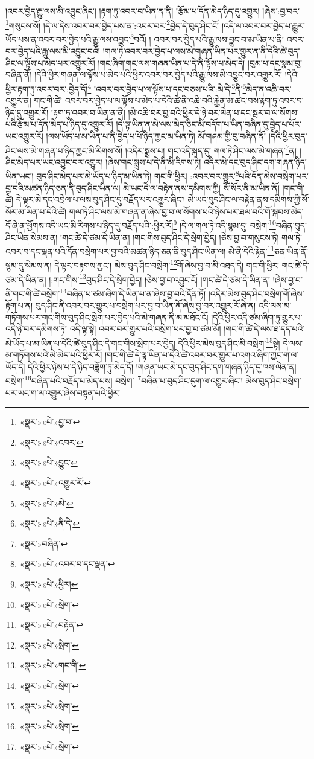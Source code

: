 །འབར་བྱེད་རྒྱུ་ལས་མི་འབྱུང་ཞིང་། །རྟག་ཏུ་འབར་བ་ཡིན་ན་ནི། །རྩོམ་པ་དོན་མེད་ཉིད་དུ་འགྱུར། །ཞེས་:བྱ་བར་\footnote{«སྣར་»«པེ་»བྱ་བ་}གསུངས་སོ། །དེ་ལ་དེས་འབར་བར་བྱེད་པས་ན་:འབར་བར་\footnote{«སྣར་»«པེ་»འབར་}བྱེད་དེ་བུད་ཤིང་ངོ། །འདི་ལ་འབར་བར་བྱེད་པ་རྒྱུར་ཡོད་པས་ན་འབར་བར་བྱེད་པའི་རྒྱུ་ལས་འབྱུང་\footnote{«སྣར་»«པེ་»བྱུང་}བའོ། །
འབར་བར་བྱེད་པའི་རྒྱུ་ལས་བྱུང་བ་མ་ཡིན་པ་ནི། འབར་བར་བྱེད་པའི་རྒྱུ་ལས་མི་འབྱུང་བའོ། །གལ་ཏེ་འབར་བར་བྱེད་པ་ལས་མེ་གཞན་ཡིན་པར་གྱུར་ན་ནི་དེའི་ཚེ་བུད་ཤིང་ལ་ལྟོས་པ་མེད་པར་འགྱུར་རོ། །གང་ཞིག་གང་ལས་གཞན་ཡིན་པ་དེ་ནི་ལྟོས་པ་མེད་དེ། །བུམ་པ་དང་སྣམ་བུ་བཞིན་ནོ། །དེའི་ཕྱིར་གཞན་ལ་ལྟོས་པ་མེད་པའི་ཕྱིར་འབར་བར་བྱེད་པའི་རྒྱུ་ལས་མི་འབྱུང་བར་འགྱུར་རོ། །དེའི་ཕྱིར་རྟག་ཏུ་འབར་བར་:བྱེད་དོ།\footnote{«སྣར་»«པེ་»འགྱུར་རོ།} །འབར་བར་བྱེད་པ་ལ་ལྟོས་པ་དང་བཅས་པའི་:མེ་དེ་\footnote{«སྣར་»«པེ་»མེ་}ནི་\footnote{«སྣར་»«པེ་»ནི་དེ་}མེད་ན་འཆི་བར་འགྱུར་ན། གང་གི་ཚེ། འབར་བར་བྱེད་པ་ལ་ལྟོས་པ་མེད་པ་དེའི་ཚེ་ནི་འཆི་བའི་རྐྱེན་མ་ཚང་བས་རྟག་ཏུ་འབར་བ་ཉིད་དུ་འགྱུར་རོ། །རྟག་ཏུ་འབར་བ་ཡིན་ན་ནི། །མི་འཆི་བར་བྱ་བའི་ཕྱིར་དེ་ཉེ་བར་ལེན་པ་དང་སྦར་བ་ལ་སོགས་པའི་རྩོམ་པ་དོན་མེད་པ་ཉིད་དུ་འགྱུར་རོ། །དེ་ལྟ་ཡིན་ན་མེ་ལས་མེད་ཅིང་མི་བདོག་པ་ཡིན་བཞིན་དུ་བྱེད་པ་པོར་ཡང་འགྱུར་རོ། །ལས་ཡོད་པ་མ་ཡིན་པ་ནི་བྱེད་པ་པོ་ཉིད་ཀྱང་མ་ཡིན་ཏེ། མོ་གཤམ་གྱི་བུ་བཞིན་ནོ། །དེའི་ཕྱིར་བུད་ཤིང་ལས་མེ་གཞན་པ་ཉིད་ཀྱང་མི་རིགས་སོ། །འདིར་སྨྲས་པ། གང་འདི་སྐད་དུ། གལ་ཏེ་ཤིང་ལས་མེ་གཞན་\footnote{«སྣར་»བཞིན་}ན། །ཤིང་མེད་པར་ཡང་འབྱུང་བར་འགྱུར། །ཞེས་གང་སྨྲས་པ་དེ་ནི་མི་རིགས་ཏེ། འདིར་མེ་དང་བུད་ཤིང་དག་གཞན་ཉིད་ཡིན་ཡང་། བུད་ཤིང་མེད་པར་མེ་ཡོད་པ་ཉིད་མ་ཡིན་ཏེ། གང་གི་ཕྱིར། :འབར་བར་གྱུར་\footnote{«སྣར་»«པེ་»འབར་བ་དང་ལྡན་}པའི་དོན་མེས་བསྲེག་པར་བྱ་བའི་མཚན་ཉིད་ཅན་ནི་བུད་ཤིང་ཡིན་ལ། མེ་ཡང་དེ་ལ་བརྟེན་ནས་དམིགས་ཀྱི། སོ་སོར་ནི་མ་ཡིན་ནོ། །གང་གི་ཚེ། དེ་ལྟར་མེ་དང་འབྲེལ་པ་ལས་བུད་ཤིང་དུ་བརྗོད་པར་འགྱུར་ཞིང་། མེ་ཡང་བུད་ཤིང་ལ་བརྟེན་ནས་དམིགས་ཀྱི་སོ་སོར་མ་ཡིན་པ་དེའི་ཚེ། གལ་ཏེ་ཤིང་ལས་མེ་གཞན་ན་ཞེས་བྱ་བ་ལ་སོགས་པའི་ཉེས་པར་ཐལ་བའི་གོ་སྐབས་མེད་དོ་ཞེ་ན་ཕྱོགས་འདི་ཡང་མི་རིགས་པ་ཉིད་དུ་བརྗོད་པའི་:ཕྱིར་རོ།\footnote{«སྣར་»«པེ་»ཕྱིར།} །དེ་ལ་གལ་ཏེ་འདི་སྙམ་དུ། བསྲེག་\footnote{«སྣར་»«པེ་»སྲེག་}བཞིན་བུད་ཤིང་ཡིན་སེམས་ན། །གང་ཚེ་དེ་ཙམ་དེ་ཡིན་ན། །གང་གིས་བུད་ཤིང་དེ་སྲེག་བྱེད། །ཅེས་བྱ་བ་གསུངས་ཏེ། གལ་ཏེ་འབར་བ་དང་ལྡན་པའི་དོན་བསྲེག་པར་བྱ་བའི་མཚན་ཉིད་ཅན་ནི་བུད་ཤིང་ཡིན་ལ། མེ་ནི་དེའི་རྟེན་\footnote{«སྣར་»«པེ་»བརྟེན་}ཅན་ཡིན་ནོ་སྙམ་དུ་སེམས་ན། དེ་ལྟར་བརྟགས་ཀྱང་། མེས་བུད་ཤིང་བསྲེག་\footnote{«སྣར་»«པེ་»སྲེག་}གོ་ཞེས་བྱ་བ་མི་འཐད་དེ། གང་གི་ཕྱིར། གང་ཚེ་དེ་ཙམ་དེ་ཡིན་ན། །:གང་གིས་\footnote{«སྣར་»«པེ་»གང་གི་}བུད་ཤིང་དེ་སྲེག་བྱེད། །ཅེས་བྱ་བ་འབྱུང་ངོ། །གང་ཚེ་དེ་ཙམ་དེ་ཡིན་ན། །ཞེས་བྱ་བ་ནི་གང་གི་ཚེ་བསྲེག་\footnote{«སྣར་»«པེ་»སྲེག་}བཞིན་པ་ཙམ་ཞིག་དེ་ཡིན་པ་ན་ཞེས་བྱ་བའི་དོན་ཏོ། །འདིར་མེས་བུད་ཤིང་བསྲེག་གོ་ཞེས་རྟོག་པ་ན། བུད་ཤིང་ནི་འབར་བར་གྱུར་པ་བསྲེག་པར་བྱ་བ་ཡིན་ནོ་ཞེས་བྱ་བར་འགྱུར་རོ་ཞེ་ན། འདི་ལས་མ་གཏོགས་པར་གང་གིས་བུད་ཤིང་སྲེག་པར་བྱེད་པའི་མེ་གཞན་ནི་མ་མཐོང་ངོ། །དེའི་ཕྱིར་འདི་ཙམ་ཞིག་ཏུ་གྱུར་པ་འདི་ཉེ་བར་དམིགས་ཏེ། འདི་ལྟ་སྟེ། འབར་བར་གྱུར་པའི་བསྲེག་པར་བྱ་བ་ཙམ་མོ། །གང་གི་ཚེ་དེ་ལས་ཐ་དད་པའི་མེ་ཡོད་པ་མ་ཡིན་པ་དེའི་ཚེ་བུད་ཤིང་དེ་གང་གིས་སྲེག་པར་བྱེད། དེའི་ཕྱིར་མེས་བུད་ཤིང་མི་བསྲེག་\footnote{«སྣར་»«པེ་»སྲེག་}སྟེ། དེ་ལས་མ་གཏོགས་པའི་མེ་མེད་པའི་ཕྱིར་རོ། །གང་གི་ཚེ་དེ་ལྟ་ཡིན་པ་དེའི་ཚེ་འབར་བར་གྱུར་པ་འགའ་ཞིག་ཀྱང་ག་ལ་ཡོད་དེ། དེའི་ཕྱིར་ཉེས་པ་དེ་ཉིད་བཟློག་ཏུ་མེད་དོ། །གཞན་ཡང་མེ་དང་བུད་ཤིང་དག་གཞན་ཉིད་དུ་ཁས་ལེན་ན། བསྲེག་\footnote{«སྣར་»«པེ་»སྲེག་}བཞིན་པའི་བརྗོད་པ་མེད་པས། བསྲེག་\footnote{«སྣར་»«པེ་»སྲེག་}བཞིན་པ་བུད་ཤིང་དུག་ལ་འགྱུར་ཞིང་། མེས་བུད་ཤིང་བསྲེག་པར་ཡང་ག་ལ་འགྱུར་ཞེས་བསྟན་པའི་ཕྱིར། 